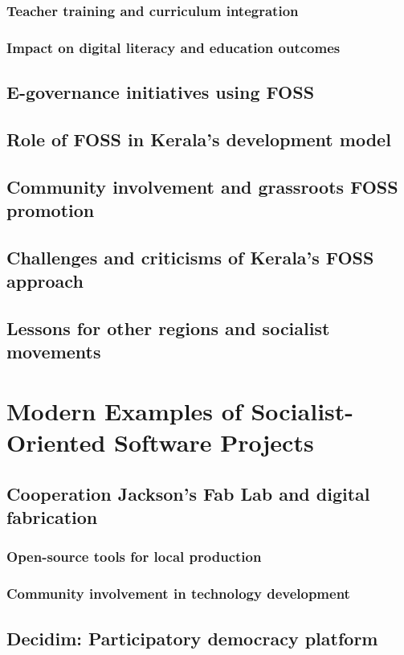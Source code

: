 \subsubsection{Teacher training and curriculum integration}
\subsubsection{Impact on digital literacy and education outcomes}
\subsection{E-governance initiatives using FOSS}
\subsection{Role of FOSS in Kerala's development model}
\subsection{Community involvement and grassroots FOSS promotion}
\subsection{Challenges and criticisms of Kerala's FOSS approach}
\subsection{Lessons for other regions and socialist movements}

\newpage

\section{Modern Examples of Socialist-Oriented Software Projects}
\subsection{Cooperation Jackson's Fab Lab and digital fabrication}
\subsubsection{Open-source tools for local production}
\subsubsection{Community involvement in technology development}
\subsection{Decidim: Participatory democracy platform}
